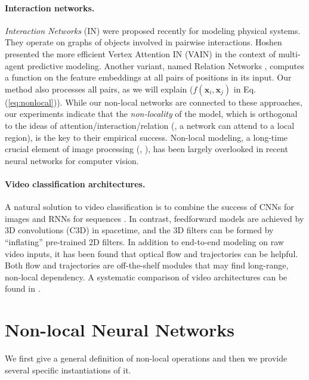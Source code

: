 \documentclass[10pt,twocolumn,letterpaper]{article}
\newcommand{\ve}[1]{\mathbf{#1}} %
\begin{document}
\paragraph{Interaction networks.} \emph{Interaction Networks} (IN) \cite{Battaglia2016,Watters2017} were proposed recently for modeling physical systems. They operate on graphs of objects involved in pairwise interactions. Hoshen \cite{Hoshen2017} presented the more efficient Vertex Attention IN (VAIN) in the context of multi-agent predictive modeling. Another variant, named Relation Networks \cite{Santoro2017}, computes a function on the feature embeddings at all pairs of positions in its input. Our method also processes all pairs, as we will explain ($f(\ve{x}_i, \ve{x}_j)$ in Eq.(\ref{eq:nonlocal})). While our non-local networks are connected to these approaches, our experiments indicate that the \emph{non-locality} of the model, which is orthogonal to the ideas of attention/interaction/relation (\eg, a network can attend to a local region), is the key to their empirical success. Non-local modeling, a long-time crucial element of image processing (\eg, \cite{Efros1999,Buades2005}), has been largely overlooked in recent neural networks for computer vision.

\paragraph{Video classification architectures.} A natural solution to video classification is to combine the success of CNNs for images and RNNs for sequences \cite{Yue-HeiNg2015,Donahue2015}. In contrast, feedforward models are achieved by 3D convolutions (C3D) \cite{Ji2010,Tran2015} in spacetime, and the 3D filters can be formed by ``inflating'' \cite{Feichtenhofer2016,Carreira2017} pre-trained 2D filters.
In addition to end-to-end modeling on raw video inputs, it has been found that optical flow \cite{Simonyan2014} and trajectories \cite{Wang2013a,Wang2015} can be helpful. Both flow and trajectories are off-the-shelf modules that may find long-range, non-local dependency. A systematic comparison of video architectures can be found in \cite{Carreira2017}.

\vspace{-.2em}
\section{Non-local Neural Networks}
We first give a general definition of non-local operations and then we provide several specific instantiations of it.
\end{document}
